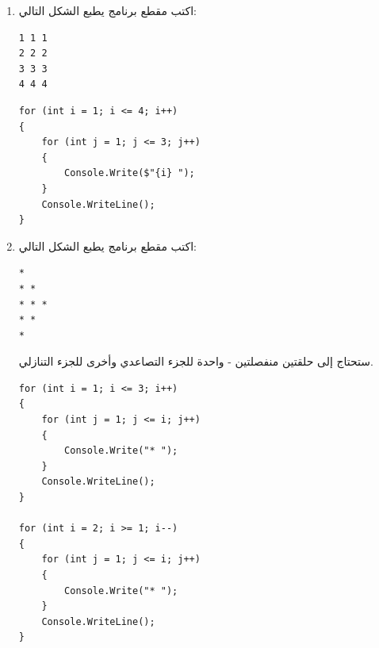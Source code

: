 \documentclass[14pt]{extarticle}
\begin{document}
\begin{enumerate}[itemsep=2em]
    \item
    اكتب مقطع برنامج يطبع الشكل التالي:
    \begin{english}
    \begin{boxCode}
\begin{verbatim}
1 1 1
2 2 2
3 3 3
4 4 4
    \end{verbatim}
\end{boxCode}
    \end{english}
    \ifwithsols
    \begin{boxSolution}
    \begin{english}
    \begin{verbatim}
for (int i = 1; i <= 4; i++)
{
    for (int j = 1; j <= 3; j++)
    {
        Console.Write($"{i} ");
    }
    Console.WriteLine();
}
    \end{verbatim}
    \end{english}
    \end{boxSolution}
    \fi

    \clearpage
    \item
    اكتب مقطع برنامج يطبع الشكل التالي:
    \begin{english}
    \begin{boxCode}
\begin{verbatim}
*
* *
* * *
* *
*
    \end{verbatim}
\end{boxCode}
    \end{english}
    \begin{boxHint}
        ستحتاج إلى حلقتين منفصلتين - واحدة للجزء التصاعدي وأخرى للجزء التنازلي.
    \end{boxHint}
    \ifwithsols
    \begin{boxSolution}
    \begin{english}
    \begin{verbatim}
for (int i = 1; i <= 3; i++)
{
    for (int j = 1; j <= i; j++)
    {
        Console.Write("* ");
    }
    Console.WriteLine();
}

for (int i = 2; i >= 1; i--)
{
    for (int j = 1; j <= i; j++)
    {
        Console.Write("* ");
    }
    Console.WriteLine();
}
    \end{verbatim}
    \end{english}
    \end{boxSolution}
    \fi

\end{enumerate}
\end{document}
